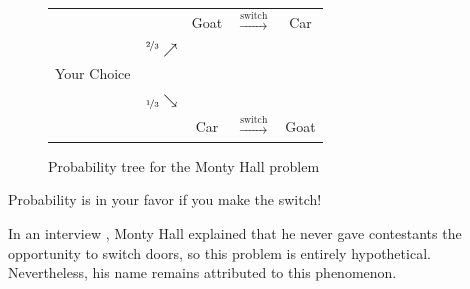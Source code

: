 \documentclass[final]{ukthesis} %
\begin{document}
\begin{figure}[h]
\centering
\begin{tabular}{ccccc}
			&	& Goat	& $\stackrel{\text{switch}}{\longrightarrow}$ & Car	\\
			& $^{\nicefrac{2}{3}}\nearrow$	& &		&	\\
Your Choice	&	& 		&	& \\
			& $_{\nicefrac{1}{3}}\searrow$	& &		&	\\
			&	& Car	& $\stackrel{\text{switch}}{\longrightarrow}$ & Goat
\end{tabular}
\caption{Probability tree for the Monty Hall problem}
\end{figure}

Probability is in your favor if you make the switch!

In an interview \cite{monty}, Monty Hall explained that he never gave contestants the opportunity to switch doors, so this problem is entirely hypothetical. Nevertheless, his name remains attributed to this phenomenon.


\copyrightnotice %

\backmatter %

\end{document}
